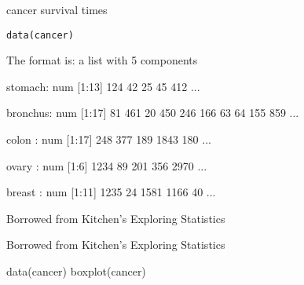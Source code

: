 \begin{Description}\relax
cancer survival times
\end{Description}
\begin{Usage}
\begin{verbatim}data(cancer)\end{verbatim}
\end{Usage}
\begin{Format}\relax
The format is:
a list with  5 components
\item[stomach:] num [1:13] 124  42  25  45 412 ...
\item[bronchus:] num [1:17] 81 461 20 450 246 166 63 64 155 859 ...
\item[colon   :] num [1:17]  248  377  189 1843  180 ...
\item[ovary   : ] num [1:6] 1234   89  201  356 2970 ...
\item[breast  :] num [1:11] 1235   24 1581 1166   40 ...
\end{Format}
\begin{Source}\relax
Borrowed from Kitchen's Exploring Statistics
\end{Source}
\begin{References}\relax
Borrowed from Kitchen's Exploring Statistics
\end{References}
\begin{Examples}
\begin{ExampleCode}
data(cancer)
boxplot(cancer)
\end{ExampleCode}
\end{Examples}

